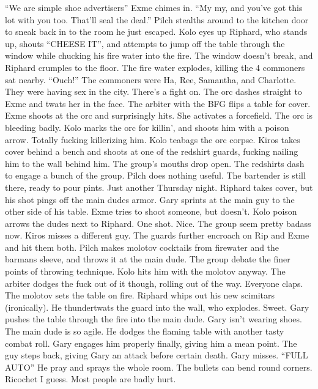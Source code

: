 “We are simple shoe advertisers” Exme chimes in.\medskip
“My my, and you’ve got this lot with you too. That’ll seal the deal.”\medskip
Pilch stealths around to the kitchen door to sneak back in to the room he just escaped.\medskip
Kolo eyes up Riphard, who stands up, shouts “CHEESE IT”, and attempts to jump off the table through the window while chucking his fire water into the fire. The window doesn’t break, and Riphard crumples to the floor. The fire water explodes, killing the 4 commoners sat nearby.\medskip
“Ouch!”\medskip
The commoners were Ha, Ree, Samantha, and Charlotte. They were having sex in the city.\medskip
There’s a fight on. The orc dashes straight to Exme and twats her in the face.\medskip
The arbiter with the BFG flips a table for cover.\medskip
Exme shoots at the orc and surprisingly hits. She activates a forcefield. The orc is bleeding badly.\medskip
Kolo marks the orc for killin’, and shoots him with a poison arrow. Totally fucking killerizing him. Kolo teabags the orc corpse.\medskip
Kiros takes cover behind a bench and shoots at one of the redshirt guards, fucking nailing him to the wall behind him. The group’s mouths drop open.\medskip
The redshirts dash to engage a bunch of the group.\medskip
Pilch does nothing useful.\medskip
The bartender is still there, ready to pour pints. Just another Thursday night.\medskip
Riphard takes cover, but his shot pings off the main dudes armor.\medskip
Gary sprints at the main guy to the other side of his table. Exme tries to shoot someone, but doesn't.\medskip
Kolo poison arrows the dudes next to Riphard. One shot. Nice.\medskip
The group seem pretty badass now.\medskip
Kiros misses a different guy.\medskip
The guards further encroach on Rip and Exme and hit them both.\medskip
Pilch makes molotov cocktails from firewater and the barmans sleeve, and throws it at the main dude.\medskip
The group debate the finer points of throwing technique.\medskip
Kolo hits him with the molotov anyway. The arbiter dodges the fuck out of it though, rolling out of the way. Everyone claps. The molotov sets the table on fire.\medskip
Riphard whips out his new scimitars (ironically). He thundertwats the guard into the wall, who explodes. Sweet.\medskip
Gary pushes the table through the fire into the main dude. Gary isn’t wearing shoes. The main dude is so agile. He dodges the flaming table with another tasty combat roll. Gary engages him properly finally, giving him a mean point.\medskip
The guy steps back, giving Gary an attack before certain death. Gary misses.\medskip
“FULL AUTO” He pray and sprays the whole room. The bullets can bend round corners. Ricochet I guess. Most people are badly hurt.\medskip
